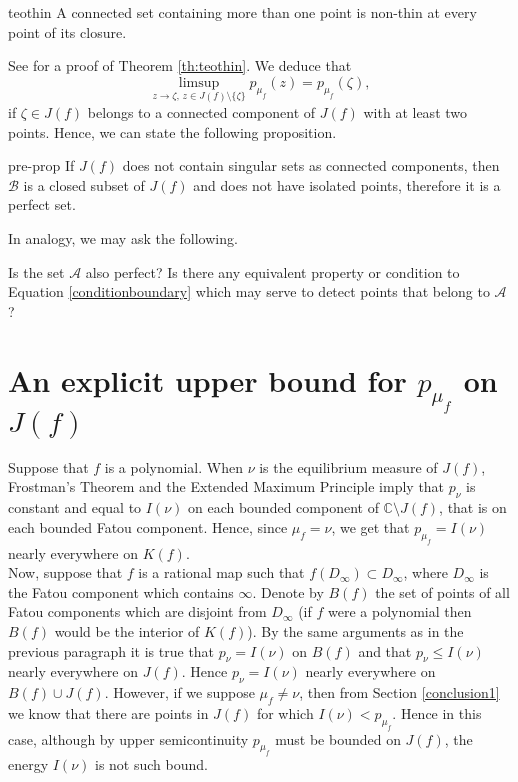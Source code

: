 \begin{mytheo}{}{teothin}
A connected set containing more than one point is non-thin at every point of its closure.
\end{mytheo}

See \cite[Theorem 3.8.3]{ransford} for a proof of Theorem \ref{th:teothin}. We deduce that
$$\limsup_{z\rightarrow \zeta ,\, z\in J(f)\setminus \{\zeta\}} p_{\mu_f}(z) = p_{\mu_f}(\zeta),$$
if $\zeta\in J(f)$ belongs to a connected component of $J(f)$ with at least two points. Hence, we can state the following proposition.

\begin{myprop}{}{pre-prop}
If $J(f)$ does not contain singular sets as connected components, then $\mathcal{B}$ is a closed subset of $J(f)$ and does not have isolated points, therefore it is a perfect set.
\end{myprop}

In analogy, we may ask the following.\\
\begin{myqstn}{}{}
Is the set $\mathcal{A}$ also perfect? Is there any equivalent property or condition to Equation \eqref{conditionboundary} which may serve to detect points that belong to $\mathcal{A}$?
\end{myqstn}

\section{An explicit upper bound for $p_{\mu_f}$ on $J(f)$}

Suppose that $f$ is a polynomial. When $\nu$ is the equilibrium measure of $J(f)$, Frostman's Theorem and the Extended Maximum Principle imply that $p_\nu$ is constant and equal to $I(\nu)$ on each bounded component of $\mathbb{C}\setminus J(f)$, that is on each bounded Fatou component. Hence, since $\mu_f=\nu$, we get that $p_{\mu_f}=I(\nu)$ nearly everywhere on $K(f)$.\\

Now, suppose that $f$ is a rational map such that $f(D_\infty)\subset D_\infty$, where $D_\infty$ is the Fatou component which contains $\infty$. Denote by $B(f)$ the set of points of all Fatou components which are disjoint from $D_\infty$ (if $f$ were a polynomial then $B(f)$ would be the interior of $K(f)$). By the same arguments as in the previous paragraph it is true that $p_\nu=I(\nu)$ on $B(f)$ and that $p_\nu \leq I(\nu)$ nearly everywhere on $J(f)$. Hence $p_\nu= I(\nu)$ nearly everywhere on $B(f)\cup J(f)$. However, if we suppose $\mu_f\neq \nu$, then from Section \ref{conclusion1} we know that there are points in $J(f)$ for which $I(\nu)< p_{\mu_f}$. Hence in this case, although by upper semicontinuity $p_{\mu_f}$ must be bounded on $J(f)$, the energy $I(\nu)$ is not such bound.\\

